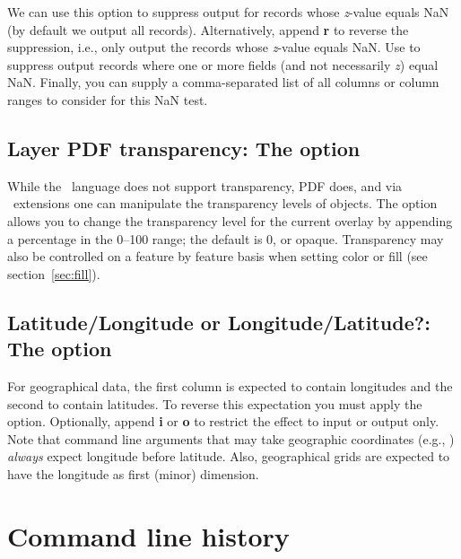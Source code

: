 We can use this option to suppress output for records whose \emph{z}-value equals NaN
(by default we output all records).  Alternatively, append \textbf{r} to reverse the suppression,
i.e., only output the records whose \emph{z}-value equals NaN.  Use  to suppress
output records where one or more fields (and not necessarily \emph{z}) equal NaN.  Finally, you can supply
a comma-separated list of all columns or column ranges to consider for this NaN test.

\subsection{Layer PDF transparency: The  option}
\label{sec:ltransp}

While the \PS\ language does not support transparency, PDF does, and via \PS\ extensions
one can manipulate the transparency levels of objects.  The  option allows you to change
the transparency level for the current overlay by appending a percentage in the 0--100 range; the
default is 0, or opaque.  Transparency may also be controlled
on a feature by feature basis when setting color or fill (see section~\ref{sec:fill}).

\subsection{Latitude/Longitude or Longitude/Latitude?: The \Opt{:} option}

For geographical data, the first column is expected to contain longitudes
and the second to contain latitudes.  To reverse this expectation you must
apply the \Opt{:} option.  Optionally, append \textbf{i} or \textbf{o} to restrict
the effect to input or output only.  Note that command line arguments that may take
geographic coordinates (e.g., ) \emph{always} expect longitude before
latitude. Also, geographical grids are expected to have the longitude as
first (minor) dimension.

%

\section{Command line history}
\label{sec:gmtcommands}

